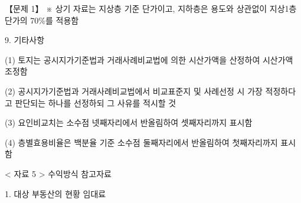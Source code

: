 \begin{longquestion}{【문제 1】}
※ 상기 자료는 지상층 기준 단가이고, 지하층은 용도와 상관없이 지상1층 단가의 70\%를 적용함 \par
9. 기타사항 \par
\medskip\noindent (1) 토지는 공시지가기준법과 거래사례비교법에 의한 시산가액을 산정하여 시산가액 조정함 \par
\medskip\noindent (2) 공시지가기준법과 거래사례비교법에서 비교표준지 및 사례선정 시 가장 적정하다고 판단되는 하나를 선정하되 그 사유를 적시할 것 \par
\medskip\noindent (3) 요인비교치는 소수점 넷째자리에서 반올림하여 셋째자리까지 표시함 \par
\medskip\noindent (4) 층별효용비율은 백분율 기준 소수점 둘째자리에서 반올림하여 첫째자리까지 표시함 \par
< 자료 5 > 수익방식 참고자료 \par
1. 대상 부동산의 현황 임대료 \par
{\small\centering\renewcommand{\arraystretch}{1.25}
\par}


\end{longquestion}
